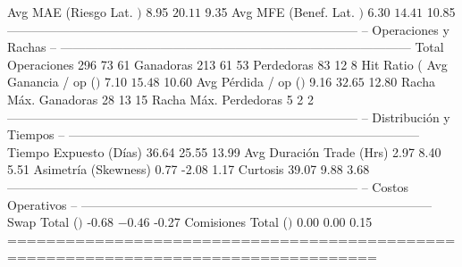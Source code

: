   Avg MAE (Riesgo Lat. $)     $           8.95  $          20.11  $           9.35
  Avg MFE (Benef. Lat. $)     $           6.30  $          14.41  $          10.85
------------------------------------------------------------------------------------
  -- Operaciones y Rachas --
------------------------------------------------------------------------------------
  Total Operaciones                        296                73                61
  Ganadoras                                213                61                53
  Perdedoras                                83                12                 8
  Hit Ratio (%
  Avg Ganancia / op ($)       $           7.10  $          15.48  $          10.60
  Avg Pérdida / op ($)        $           9.16  $          32.65  $          12.80
  Racha Máx. Ganadoras                      28                13                15
  Racha Máx. Perdedoras                      5                 2                 2
------------------------------------------------------------------------------------
  -- Distribución y Tiempos --
------------------------------------------------------------------------------------
  Tiempo Expuesto (Días)                 36.64             25.55             13.99
  Avg Duración Trade (Hrs)                2.97              8.40              5.51
  Asimetría (Skewness)                    0.77             -2.08              1.17
  Curtosis                               39.07              9.88              3.68
------------------------------------------------------------------------------------
  -- Costos Operativos --
------------------------------------------------------------------------------------
  Swap Total ($)              $          -0.68  $          -0.46  $          -0.27
  Comisiones Total ($)        $           0.00  $           0.00  $           0.15
====================================================================================

